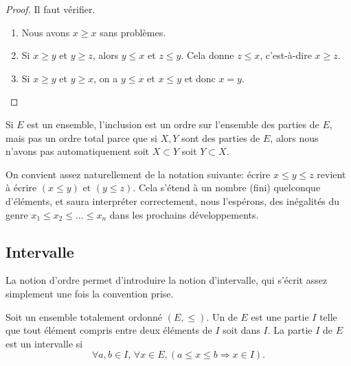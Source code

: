 \begin{proof}
	Il faut vérifier.
	\begin{enumerate}
		\item
		      Nous avons \( x\geq x\) sans problèmes.
		\item
		      Si \( x\geq y\) et \( y\geq z\), alors \( y\leq x\) et \( z\leq y\). Cela donne \( z\leq x\), c'est-à-dire  \( x\geq z\).
		\item
		      Si \( x\geq y\) et \( y\geq x\), on a \( y\leq x\) et \( x\leq y\) et donc \( x=y\).
	\end{enumerate}
\end{proof}

\begin{example}  \label{ExeooOrdreInclusion}
	Si \( E\) est un ensemble, l'inclusion est un ordre sur l'ensemble des parties de \( E\), mais pas un ordre total parce que si \( X,Y\) sont des parties de \( E\), alors nous n'avons pas automatiquement soit \( X\subset Y\) soit \( Y\subset X\).
\end{example}

\begin{normaltext}\label{NORMooIntroIntervalleOrdonne}
	On convient assez naturellement de la notation suivante: écrire \( x \leq y \leq z \) revient à écrire \( (x \leq y)\text{ et } (y \leq z) \). Cela s'étend à un nombre (fini) quelconque d'éléments, et  saura interpréter correctement, nous l'espérons, des inégalités du genre \( x_1 \leq x_2 \leq \dots \leq x_n \) dans les prochains développements.
\end{normaltext}




\subsection{Intervalle}


La notion d'ordre permet d'introduire la notion d'intervalle, qui s'écrit assez simplement une fois la convention prise.

\begin{definition}  \label{DefEYAooMYYTz}
	Soit un ensemble totalement ordonné \( (E,\leq)\). Un  de \( E\) est une partie \( I\) telle que tout élément compris entre deux éléments de \( I \) soit dans \( I \). La partie \( I \) de \( E\) est un intervalle si
	\[
		\forall a,b\in I,\, \forall x \in E, (a\leq x\leq b \Rightarrow x\in I).
	\]
\end{definition}

